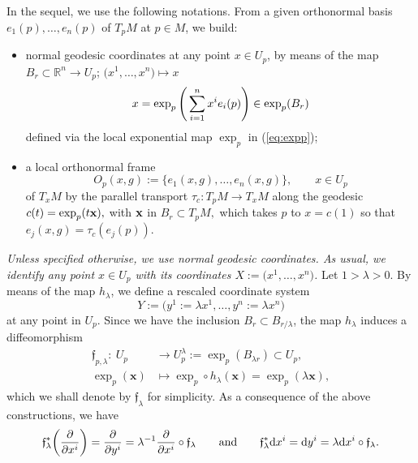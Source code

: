 \documentclass[pdftex]{sigma}
\numberwithin{equation}{section}
\theoremstyle{definition}
\newcommand{\R}{\mathbb R}
\begin{document}
In the sequel, we use the following notations. From a given orthonormal basis $e_1(p), \dots,\allowbreak e_n(p)$ of $T_pM$ at $p\in M$, we build:
\begin{itemize}\itemsep=0pt
	\item normal geodesic coordinates at any point $x\in U_p$, by means of the map $ {B}_r\subset\R^n\to U_p$; $\bigl(x^1,\dots,x^n\bigr)\mapsto x$
\begin{equation}\label{eq:geodesiccoord}
x=\exp_p\Bigg(\sum_{i=1}^n x^i e_i(p)\Bigg)\in {\rm exp}_p(B_r)
\end{equation}
	 defined via the local exponential map $\exp_p$ in (\ref{eq:expp});
	\item a local orthonormal frame
\begin{equation}\label{eq:Op}
O_p(x, g):=\{e_1(x, g),\dots,e_n(x, g)\},\qquad x\in U_p
\end{equation}
of $T_xM$ by the parallel transport $\tau_{c}\colon T_pM\to T_xM$ along the geodesic $c(t)= \exp_p(t {\bf x}), $ with $ {\bf x}$ in $B_r\subset T_pM,$ which takes $p$ to $x= c(1)$ so that $e_j(x, g)=\tau_{c} (e_j(p))$.
\end{itemize}

{\it Unless specified otherwise, we use normal geodesic coordinates. As usual, we identify any point $x\in U_p$ with its coordinates $X:=\bigl(x^1,\dots, x^n\bigr)$.} Let $1>\lambda>0$. By means of the map $h_\lambda$,
 we define a rescaled coordinate system
\begin{equation*}
	Y:=\bigl(y^1:= \lambda x^1, \dots, y^n:= \lambda x^n\bigr)
\end{equation*}
at any point in $U_p$. Since
we have the inclusion $ {B_r \subset B_{r/\lambda}}$, the map $h_\lambda$
 induces a diffeomorphism
 \begin{align}
 {\mathfrak f}_{p,\lambda}\colon \ U_{p} &\longrightarrow U_{p}^\lambda:=\exp_p(B_{\lambda r})\subset U_p,\nonumber\\
	 \exp_{p}({\mathbf x})&\longmapsto \exp_p\circ h_\lambda( {\mathbf x})= \exp_{p}( \lambda {\mathbf x}),\label{eq:flambdaUplambda}
\end{align}
which we shall denote by ${\mathfrak f}_\lambda$ for simplicity. As a consequence of the above constructions, we have
\begin{gather}
\mathfrak{f}_\lambda^*\biggl(\frac{\partial}{\partial x^{i}}\biggr)=\frac{\partial}{\partial y^i}=\lambda^{-1} \frac{\partial}{\partial x^{i}}\circ \mathfrak{f}_\lambda \qquad\text{and}\qquad \mathfrak{f}_\lambda^* {\rm d}x^i={\rm d}y^i=\lambda {\rm d}x^i\circ \mathfrak{f}_\lambda.\label{eq:derivativedifferent}
\end{gather}
\end{document}
